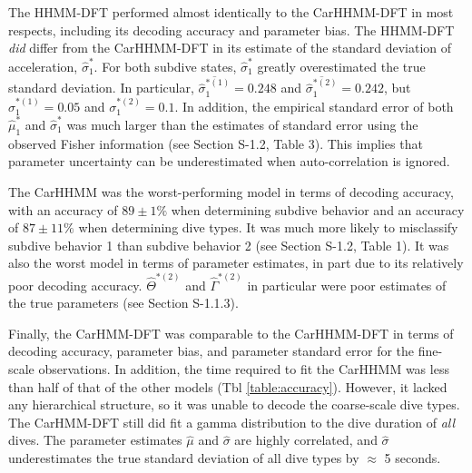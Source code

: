 The HHMM-DFT performed almost identically to the CarHHMM-DFT in most respects, including its decoding accuracy and parameter bias. 
The HHMM-DFT \textit{did} differ from the CarHHMM-DFT in its estimate of the standard deviation of acceleration, $\hat \sigma_1^*$. For both subdive states, $\hat \sigma_1^*$ greatly overestimated the true standard deviation. In particular, $\overline{\hat \sigma_1^{*(1)}} = 0.248$ and $\overline{\hat \sigma_1^{*(2)}} = 0.242$, but $\sigma_1^{*(1)} = 0.05$ and $\sigma_1^{*(2)} = 0.1$. In addition, the empirical standard error of both $\hat \mu_1^*$ and $\hat \sigma_1^*$ was much larger than the estimates of standard error using the observed Fisher information (see Section S-1.2, Table 3). This implies that parameter uncertainty can be underestimated when auto-correlation is ignored.

The CarHHMM was the worst-performing model in terms of decoding accuracy, with an accuracy of $89 \pm 1\%$ when determining subdive behavior and an accuracy of $87 \pm 11\%$ when determining dive types. It was much more likely to misclassify subdive behavior 1 than subdive behavior 2 (see Section S-1.2, Table 1). It was also the worst model in terms of parameter estimates, in part due to its relatively poor decoding accuracy. $\hat \Theta^{*(2)}$ and $\hat \Gamma^{*(2)}$ in particular were poor estimates of the true parameters (see Section S-1.1.3).

Finally, the CarHMM-DFT was comparable to the CarHHMM-DFT in terms of decoding accuracy, parameter bias, and parameter standard error for the fine-scale observations. In addition, the time required to fit the CarHHMM was less than half of that of the other models (Tbl \ref{table:accuracy}). However, it lacked any hierarchical structure, so it was unable to decode the coarse-scale dive types. The CarHMM-DFT still did fit a gamma distribution to the dive duration of \textit{all} dives. The parameter estimates $\hat \mu$ and $\hat \sigma$ are highly correlated, and $\hat \sigma$ underestimates the true standard deviation of all dive types by $\approx$ 5 seconds.




